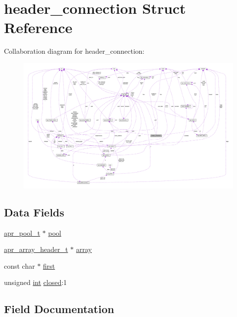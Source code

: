 \hypertarget{structheader__connection}{}\section{header\+\_\+connection Struct Reference}
\label{structheader__connection}


Collaboration diagram for header\+\_\+connection\+:
\nopagebreak
\begin{figure}[H]
\begin{center}
\leavevmode
\includegraphics[width=350pt]{structheader__connection__coll__graph}
\end{center}
\end{figure}
\subsection*{Data Fields}
\begin{DoxyCompactItemize}
\item 
\hyperlink{structapr__pool__t}{apr\+\_\+pool\+\_\+t} $\ast$ \hyperlink{structheader__connection_a117a3b4fdca089855b190ca7eef6cd6f}{pool}
\item 
\hyperlink{structapr__array__header__t}{apr\+\_\+array\+\_\+header\+\_\+t} $\ast$ \hyperlink{structheader__connection_a113b187581b43943341ffb9a02fd70a4}{array}
\item 
const char $\ast$ \hyperlink{structheader__connection_a72b1df3d9eca6e33e820c36aa8c1d193}{first}
\item 
unsigned \hyperlink{pcre_8txt_a42dfa4ff673c82d8efe7144098fbc198}{int} \hyperlink{structheader__connection_aa8ef359394d52be89ba2e2ea31d11de2}{closed}\+:1
\end{DoxyCompactItemize}


\subsection{Field Documentation}
